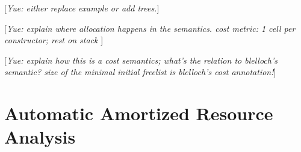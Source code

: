 \documentclass{easychair}
\newcommand{\yue}[1]{{\color{blue} [\emph{Yue: #1}]}}
\theoremstyle{definition}
\begin{document}



\yue{either replace example or add trees.}

\yue{explain where allocation happens in the semantics. cost metric: 1 cell per constructor; rest on stack }

\yue{explain how this is a cost semantics; what's the relation to blelloch's semantic? size of the minimal initial freelist is blelloch's cost annotation!}

\section{Automatic Amortized Resource Analysis}
\label{sect:aara}
\end{document}
